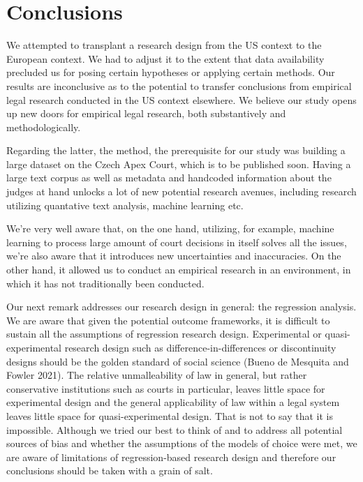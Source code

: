 \documentclass[
  11pt,
]{article}
\begin{document}
\hypertarget{conclusions}{%
\section{Conclusions}\label{conclusions}}

We attempted to transplant a research design from the US context to the
European context. We had to adjust it to the extent that data
availability precluded us for posing certain hypotheses or applying
certain methods. Our results are inconclusive as to the potential to
transfer conclusions from empirical legal research conducted in the US
context elsewhere. We believe our study opens up new doors for empirical
legal research, both substantively and methodologically.

Regarding the latter, the method, the prerequisite for our study was
building a large dataset on the Czech Apex Court, which is to be
published soon. Having a large text corpus as well as metadata and
handcoded information about the judges at hand unlocks a lot of new
potential research avenues, including research utilizing quantative text
analysis, machine learning etc.

We're very well aware that, on the one hand, utilizing, for example,
machine learning to process large amount of court decisions in itself
solves all the issues, we're also aware that it introduces new
uncertainties and inaccuracies. On the other hand, it allowed us to
conduct an empirical research in an environment, in which it has not
traditionally been conducted.

Our next remark addresses our research design in general: the regression
analysis. We are aware that given the potential outcome frameworks, it
is difficult to sustain all the assumptions of regression research
design. Experimental or quasi-experimental research design such as
difference-in-differences or discontinuity designs should be the golden
standard of social science (Bueno de Mesquita and Fowler 2021). The
relative unmalleability of law in general, but rather conservative
institutions such as courts in particular, leaves little space for
experimental design and the general applicability of law within a legal
system leaves little space for quasi-experimental design. That is not to
say that it is impossible. Although we tried our best to think of and to
address all potential sources of bias and whether the assumptions of the
models of choice were met, we are aware of limitations of
regression-based research design and therefore our conclusions should be
taken with a grain of salt.
\end{document}
